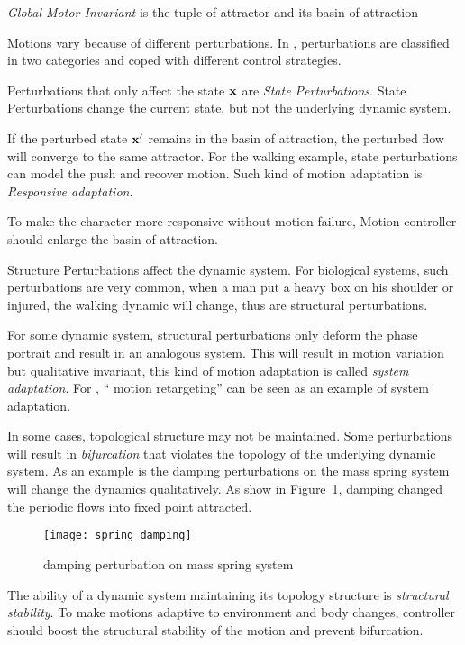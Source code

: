 \begin{mydef}
\emph{Global Motor Invariant} is the tuple of attractor and its basin of attraction
\end{mydef}


Motions vary because of different perturbations.
In \moit, perturbations are classified in two categories and coped with different control strategies.

\begin{itemize}

Perturbations that only affect the state $\mathbf{x}$ are \emph{State Perturbations}.
State Perturbations change the current state, but not the underlying dynamic system.


If the perturbed state $\mathbf{x}'$ remains in the basin of attraction, the perturbed flow will converge to the same attractor. 
For the walking example, state perturbations can model the push and recover motion.
Such kind of motion adaptation is \emph{Responsive adaptation}.


To make the character more responsive without motion failure,
Motion controller should enlarge the basin of attraction.






Structure Perturbations affect the dynamic system.
For biological systems,  such perturbations are very common, when a man put a heavy box on his shoulder or injured, the walking dynamic will change, thus are structural perturbations.


For some dynamic system,
structural perturbations only deform the phase portrait and result in an analogous system.
This will result in motion variation but qualitative invariant, this kind of motion adaptation is called \emph{system adaptation}.
For \cms, `` motion retargeting'' can be seen as an example of system adaptation.

In some cases, topological structure may not be maintained.
Some perturbations will result in \emph{bifurcation} that violates the topology of the underlying dynamic system.
As an  example is the damping perturbations on the mass spring system will change the dynamics qualitatively.
As show in Figure~\ref{fig:dampmass}, damping changed the periodic flows into fixed point attracted.

\begin{figure}
\begin{center}
\texttt{[image: spring\_damping]}
\end{center}
\caption{damping perturbation on mass spring system}
\label{fig:dampmass}
\end{figure}

The ability of a dynamic system maintaining its topology structure is \emph{structural stability}.
To make motions adaptive to environment and body changes, controller should boost the structural stability of the motion and prevent bifurcation.
\end{itemize}

